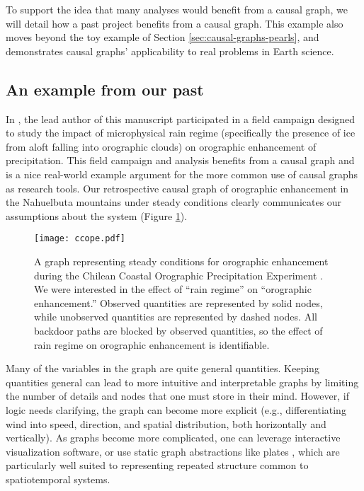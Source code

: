 \documentclass[12pt]{article}
\begin{document}
To support the idea that many analyses would benefit from a causal
graph, we will detail how a past project benefits from a causal
graph. This example also moves beyond the toy example of Section
\ref{sec:causal-graphs-pearls}, and demonstrates causal graphs'
applicability to real problems in Earth science.

\subsection{An example from our past}

In \citet{massmann2017}, the lead author of this manuscript
participated in a field campaign designed to study the impact of
microphysical rain regime (specifically the presence of ice from aloft
falling into orographic clouds) on orographic enhancement of
precipitation. This field campaign and analysis benefits from a causal
graph and is a nice real-world example argument for the more common
use of causal graphs as research tools. Our retrospective causal graph
of orographic enhancement in the Nahuelbuta mountains under steady
conditions clearly communicates our assumptions about the system
(Figure \ref{fig:ccope}).

\begin{figure} \texttt{[image: ccope.pdf]}
  \caption{A graph representing steady conditions for orographic
    enhancement during the Chilean Coastal Orographic Precipitation
    Experiment \citep[CCOPE,][]{massmann2017}. We were interested in the
    effect of ``rain regime'' on ``orographic enhancement.''  Observed
    quantities are represented by solid nodes, while unobserved quantities
    are represented by dashed nodes. All backdoor paths are blocked by
    observed quantities, so the effect of rain regime on orographic
    enhancement is identifiable.}
  \label{fig:ccope}
\end{figure}

Many of the variables in the graph are quite general
quantities. Keeping quantities general can lead to more intuitive and
interpretable graphs by limiting the number of details and nodes that
one must store in their mind. However, if logic needs clarifying, the
graph can become more explicit (e.g., differentiating wind into speed,
direction, and spatial distribution, both horizontally and
vertically). As graphs become more complicated, one can leverage
interactive visualization software, or use static graph abstractions
like plates \citep{bishop2006pattern}, which are particularly well
suited to representing repeated structure common to spatiotemporal
systems.
\end{document}
